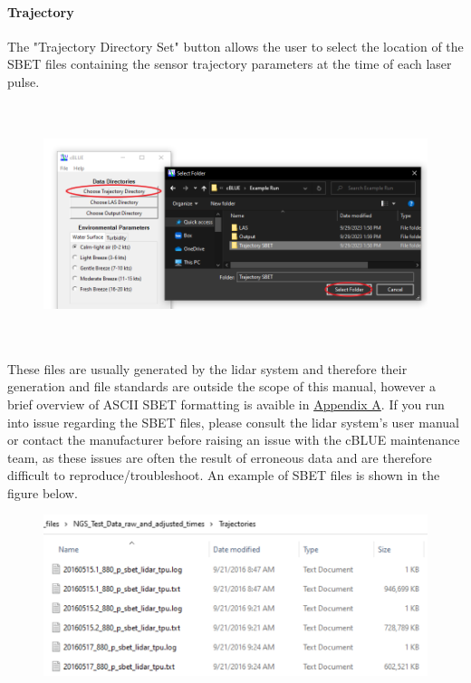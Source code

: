 \documentclass[11pt, a4paper]{article}
\begin{document}
\paragraph{Trajectory}
\hfill \break \newline
The "Trajectory Directory Set" button allows the user to select the location of the SBET files containing the sensor trajectory parameters at the time of each laser pulse.

\begin{figure}[H]
    \centering
    \includegraphics[height=7cm]{figs/select_traj_gui.png}
\end{figure}

These files are usually generated by the lidar system and therefore their generation and file standards are outside the scope of this manual, however a brief overview of ASCII SBET formatting is avaible in \hyperref[appendix:SBET]{Appendix A}. If you run into issue regarding the SBET files, please consult the lidar system's user manual or contact the manufacturer before raising an issue with the cBLUE maintenance team, as these issues are often the result of erroneous data and are therefore difficult to reproduce/troubleshoot. An example of SBET files is shown in the figure below.

\begin{figure}[H]
    \centering
    \includegraphics[width=15cm, frame=1pt 15pt]{figs/example_data.png}
\end{figure}
\end{document}
